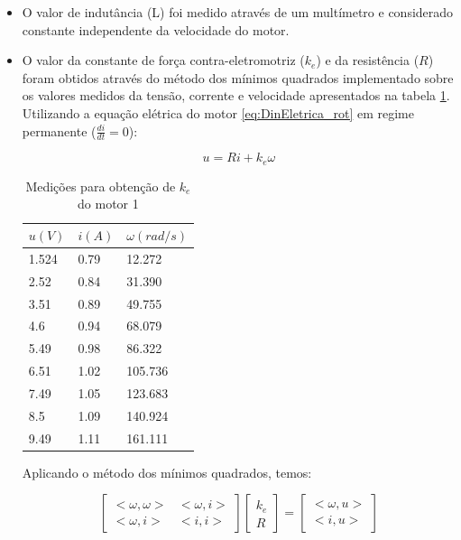 \documentclass[]{politex}
\begin{document}
\begin{itemize}
\item O valor de indutância (L) foi medido através de um multímetro e considerado constante independente da velocidade do motor.

\item O valor da constante de força contra-eletromotriz ($k_{e}$) e da resistência ($R$) foram obtidos através do método dos mínimos quadrados implementado sobre os valores medidos da tensão, corrente e velocidade apresentados na tabela \ref{MMQke}. Utilizando a equação elétrica do motor \eqref{eq:DinEletrica_rot} em regime permanente ($\frac{di}{dt} = 0$): 

\begin{equation}
	   u =  R i + k_{e} \omega
\end{equation}

\begin{table}[H]
\centering
\caption{Medições para obtenção de $k_{e}$ do motor 1}
\label{MMQke}
\begin{tabular}{l|l|l}
$u(V)$     & $i(A)$    & $\omega (rad/s)$        \\ \hline
1.524 & 0.79 & 12.272  \\
2.52  & 0.84 & 31.390  \\
3.51  & 0.89 & 49.755  \\
4.6   & 0.94 & 68.079  \\
5.49  & 0.98 & 86.322  \\
6.51  & 1.02 & 105.736 \\
7.49  & 1.05 & 123.683 \\
8.5   & 1.09 & 140.924 \\
9.49  & 1.11 & 161.111
\end{tabular}
\end{table}

Aplicando o método dos mínimos quadrados, temos:

\begin{equation}
\begin{bmatrix}
<\omega, \omega> & <\omega, i>\\
<\omega, i>      & <i, i>
\end{bmatrix}
\begin{bmatrix}
k_{e}\\
R
\end{bmatrix}= 
\begin{bmatrix}
<\omega, u>\\
<i, u>
\end{bmatrix}
\end{equation}


\end{itemize}
\end{document}
